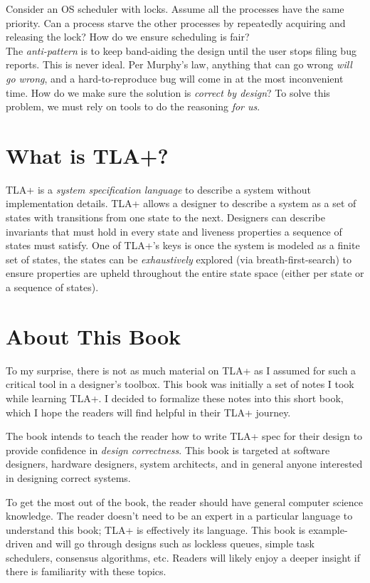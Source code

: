 Consider an OS scheduler with locks. Assume all the processes have the same
priority. Can a process starve the other processes by repeatedly acquiring and
releasing the lock? How do we ensure scheduling is fair?\\

The \textit{anti-pattern} is to keep band-aiding the design until the user stops
filing bug reports. This is never ideal. Per Murphy's law, anything that can go
wrong \textit{will go wrong}, and a hard-to-reproduce bug will come in at the
most inconvenient time. How do we make sure the solution is \textit{correct by
design}? To solve this problem, we must rely on tools to do the reasoning
\textit{for us}.

\section{What is TLA+?}

TLA+ is a \textit{system specification language} to describe a system
without implementation details. TLA+ allows a designer to describe a system as a
set of states with transitions from one state to the next. Designers can
describe invariants that must hold in every state and liveness properties a
sequence of states must satisfy. One of TLA+'s keys is once the system is modeled
as a finite set of states, the states can be \textit{exhaustively} explored
(via breath-first-search) to ensure properties are upheld throughout the entire
state space (either per state or a sequence of states).

\section{About This Book}
To my surprise, there is not as much material on TLA+ as I assumed for
such a critical tool in a designer's toolbox. This book was initially a set of
notes I took while learning TLA+. I decided to formalize these notes into this
short book, which I hope the readers will find helpful in their TLA+
journey.\newline

The book intends to teach the reader how to write TLA+ spec for their design to
provide confidence in \textit{design correctness}. This book is targeted at
software designers, hardware designers, system architects, and in general anyone
interested in designing correct systems.\newline 

To get the most out of the book, the reader should have general computer
science knowledge. The reader doesn't need to be an expert in a particular
language to understand this book; TLA+ is effectively its language. This book is
example-driven and will go through designs such as lockless queues, simple
task schedulers, consensus algorithms, etc. Readers will likely enjoy a deeper
insight if there is familiarity with these topics.

